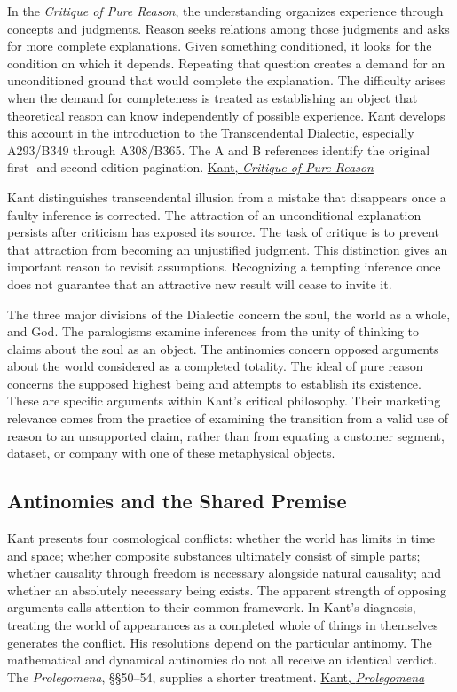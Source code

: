 \noindent \noindent In the \emph{Critique of Pure Reason}, the understanding
organizes experience through concepts and judgments. Reason seeks
relations among those judgments and asks for more complete explanations.
Given something conditioned, it looks for the condition on which it
depends. Repeating that question creates a demand for an unconditioned
ground that would complete the explanation. The difficulty arises when
the demand for completeness is treated as establishing an object that
theoretical reason can know independently of possible experience. Kant
develops this account in the introduction to the Transcendental
Dialectic, especially A293/B349 through A308/B365. The A and B
references identify the original first- and second-edition pagination.
\href{https://www.gutenberg.org/files/4280/4280-h/4280-h.htm}{Kant,
\emph{Critique of Pure Reason}}

Kant distinguishes transcendental illusion from a mistake that
disappears once a faulty inference is corrected. The attraction of an
unconditional explanation persists after criticism has exposed its
source. The task of critique is to prevent that attraction from becoming
an unjustified judgment. This distinction gives an important reason to
revisit assumptions. Recognizing a tempting inference once does not
guarantee that an attractive new result will cease to invite it.

The three major divisions of the Dialectic concern the soul, the world
as a whole, and God. The paralogisms examine inferences from the unity
of thinking to claims about the soul as an object. The antinomies
concern opposed arguments about the world considered as a completed
totality. The ideal of pure reason concerns the supposed highest being
and attempts to establish its existence. These are specific arguments
within Kant's critical philosophy. Their marketing relevance comes from
the practice of examining the transition from a valid use of reason to
an unsupported claim, rather than from equating a customer segment,
dataset, or company with one of these metaphysical objects.

\hypertarget{M09-antinomies-and-the-shared-premise}{%
\subsection{Antinomies and the Shared
Premise}\label{M09-antinomies-and-the-shared-premise}}

\noindent \noindent Kant presents four cosmological conflicts: whether the world
has limits in time and space; whether composite substances ultimately
consist of simple parts; whether causality through freedom is necessary
alongside natural causality; and whether an absolutely necessary being
exists. The apparent strength of opposing arguments calls attention to
their common framework. In Kant's diagnosis, treating the world of
appearances as a completed whole of things in themselves generates the
conflict. His resolutions depend on the particular antinomy. The
mathematical and dynamical antinomies do not all receive an identical
verdict. The \emph{Prolegomena}, §§50--54, supplies a shorter treatment.
\href{https://www.gutenberg.org/files/52821/52821-h/52821-h.htm}{Kant,
\emph{Prolegomena}}


